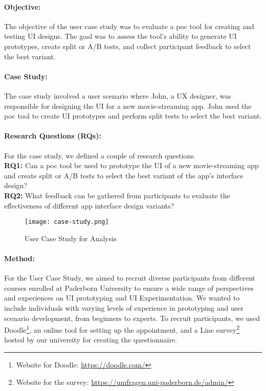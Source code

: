 \paragraph{Objective:}
The objective of the user case study was to evaluate a \ac{poc} tool for creating and testing UI designs. 
The goal was to assess the tool's ability to generate UI prototypes, create split or A/B tests, and collect participant feedback to select the best variant.

\paragraph{Case Study:}
The case study involved a user scenario where John, a UX designer, was responsible for designing the UI for a new movie-streaming app. John used the \ac{poc} tool to create UI prototypes and perform split tests to select the best variant.

\paragraph{Research Questions (RQs):}
For the case study, we defined a couple of research questions. \\
\textbf{RQ1:} Can a \ac{poc} tool be used to prototype the UI of a new movie-streaming app and create split or A/B tests to select the best variant of the app's interface design? \\
\textbf{RQ2:} What feedback can be gathered from participants to evaluate the effectiveness of different app interface design variants?

\begin{figure}[ht]
    \centering
    \texttt{[image: case-study.png]}
    \caption{User Case Study for Analysis}
    \label{evaluation:fig:casestudy}
\end{figure}

\paragraph{Method:}
For the User Case Study, we aimed to recruit diverse participants from different courses enrolled at Paderborn University to ensure a wide range of perspectives and experiences on UI prototyping and UI Experimentation. 
We wanted to include individuals with varying levels of experience in prototyping and user scenario development, from beginners to experts. 
To recruit participants, we used Doodle\footnote{Website for Doodle: \url{https://doodle.com/}}, an online tool for setting up the appointment, and a Line survey\footnote{Website for the survey: \url{https://umfragen.uni-paderborn.de/admin/}} hosted by our university for creating the questionnaire.

